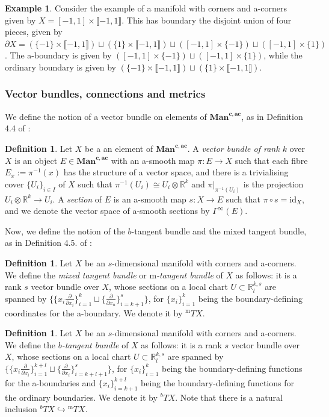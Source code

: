 \documentclass[10pt, a4paper]{article}
\theoremstyle{plain}%
\theoremstyle{definition}
\newtheorem{defn}[theorem]{Definition}
\newtheorem{ex}[theorem]{Example}
\numberwithin{figure}{section}
\numberwithin{equation}{section}
\newcommand{\bR}{\mathbb{R}}
\newcommand{\pa}{\partial}
\newcommand{\rt}{\rightarrow}
\newcommand{\mancac}{\mathbf{Man}^{\mathbf{c,ac}}}
\newcommand{\m}{\mathrm{m}}
\begin{document}
\begin{ex}
	Consider the example of a manifold with corners and a-corners given by $X = [-1,1]\times \llbracket-1,1\rrbracket$. This has boundary the disjoint union of four pieces, given by $\pa X = (\{-1\}\times \llbracket-1,1\rrbracket) \sqcup (\{1\}\times\llbracket-1,1\rrbracket) \sqcup ([-1,1]\times \{-1\} )\sqcup ([-1,1]\times \{1\})$. The a-boundary is given by $([-1,1]\times \{-1\} )\sqcup ([-1,1]\times \{1\})$, while the ordinary boundary is given by $(\{-1\}\times \llbracket-1,1\rrbracket) \sqcup (\{1\}\times\llbracket-1,1\rrbracket)$.
\end{ex}

\subsubsection{Vector bundles, connections and metrics}
We define the notion of a vector bundle on elements of $\mancac$, as in Definition 4.4 of \cite{Joy16}:
\begin{defn}
	Let $X$ be a an element of $\mancac$. A \textit{vector bundle of rank $k$} over $X$ is an object $E\in \mancac$ with an a-smooth map $\pi : E\rt X$ such that each fibre $E_x:=\pi^{-1}(x)$ has the structure of a vector space, and there is a trivialising cover $\{U_i\}_{i\in I}$ of $X$ such that $\pi^{-1}(U_i) \cong U_i\otimes \bR^k$ and $\pi|_{\pi^{-1}(U_i)}$ is the projection $ U_i\otimes \bR^k \rt U_i$. A \textit{section} of $E$ is an a-smooth map $s: X\rt E$ such that $\pi\circ s = \mathrm{id}_X$, and we denote the vector space of a-smooth sections by $\Gamma^\infty(E)$.
\end{defn}
Now, we define the notion of the $b$-tangent bundle and the mixed tangent bundle, as in Definition 4.5$.$ of \cite{Joy16}:
\begin{defn}
	Let $X$ be an $s$-dimensional manifold with corners and a-corners. We define the \textit{mixed tangent bundle} or \textit{${\m}$-tangent bundle} of $X$ as follows: it is a rank $s$ vector bundle over $X$, whose sections on a local chart $U\subset \bR^{k,s}_l$ are spanned by $\{\{x_i\frac{\partial}{\partial x_i}\}_{i=1}^{k}\sqcup \{\frac{\partial}{\partial x_n}\}_{i=k+1}^s\}$, for $\{x_i\}_{i=1}^k$ being the boundary-defining coordinates for the a-boundary. We denote it by $^{\m}TX$.
\end{defn}
\begin{defn}
	 Let $X$ be an $s$-dimensional manifold with corners and a-corners. We define the \textit{$b$-tangent bundle} of $X$ as follows: it is a rank $s$ vector bundle over $X$, whose sections on a local chart $U\subset \bR^{k,s}_l$ are spanned by $\{\{x_i\frac{\pa}{\pa x_i}\}_{i=1}^{k+l} \sqcup \{\frac{\pa}{\pa x_i}\}_{i=k+l+1}^s\}$, for $\{x_i\}_{i=1}^k$ being the boundary-defining functions for the a-boundaries and $\{x_i\}_{i=k+1}^{k+l}$ being the boundary-defining functions for the ordinary boundaries. We denote it by $^bTX$. Note that there is a natural inclusion $^bTX \hookrightarrow {^{\m}TX}$.
\end{defn}
\end{document}
